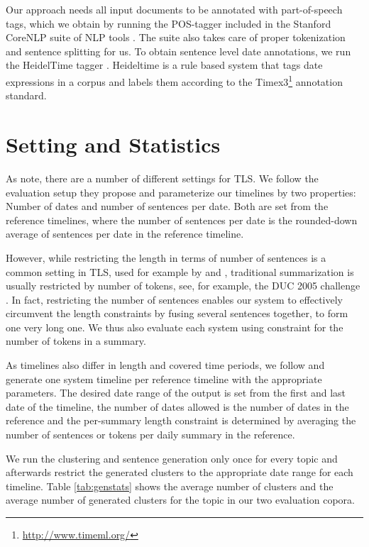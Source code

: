 \documentclass[a4paper,BCOR=10mm]{report}
\numberwithin{lemma}{chapter}
\numberwithin{definition}{chapter}
\begin{document}
Our approach needs all input documents to be annotated with part-of-speech tags, which we obtain by running the POS-tagger included in the Stanford CoreNLP suite of NLP tools \citep{stanford-corenlp}. The suite also takes care of proper tokenization and sentence splitting for us.
To obtain sentence level date annotations, we run the HeidelTime tagger \citet{heideltime}. Heideltime is a rule based system that tags date expressions in a corpus and labels them according to the Timex3\footnote{\url{http://www.timeml.org/}} annotation standard.

\section{Setting and Statistics}

As \citet{markert} note, there are a number of different settings for TLS.
We follow the evaluation setup they propose and parameterize our timelines by two properties: Number of dates and number of sentences per date. Both are set from the reference timelines, where the number of sentences per date is the rounded-down average of sentences per date in the reference timeline.

However, while restricting the length in terms of number of sentences is a common setting in TLS, used for example by \citet{chieu} and \citet{yan-trans}, traditional summarization is usually restricted by number of tokens, see, for example, the DUC 2005 challenge \citep{duc2005}. In fact, restricting the number of sentences enables our system to effectively circumvent the length constraints by fusing several sentences together, to form one very long one.
We thus also evaluate each system using constraint for the number of tokens in a summary.

As timelines also differ in length and covered time periods, we follow \citet{markert} and generate one system timeline per reference timeline with the appropriate parameters. The desired date range of the output is set from the first and last date of the timeline, the number of dates allowed is the number of dates in the reference and the per-summary length constraint is determined by averaging the number of sentences or tokens per daily summary in the reference.

We run the clustering and sentence generation only once for every topic and afterwards restrict the generated clusters to the appropriate date range for each timeline.
Table \ref{tab:genstats} shows the average number of clusters and the average number of generated clusters for the topic in our two evaluation copora.
\end{document}
